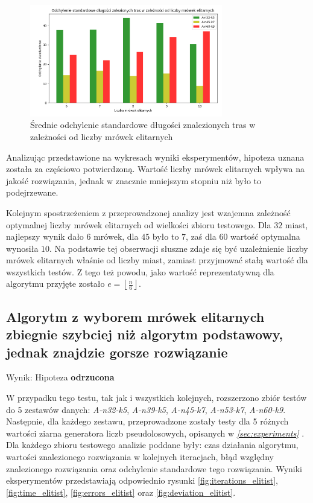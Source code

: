 \documentclass[10pt]{article}
\begin{document}
\begin{figure}[H]
    \centering
    \includegraphics[width=0.75\textwidth]{deviation_e.png}
    \caption{Średnie odchylenie standardowe długości znalezionych tras w zależności od liczby mrówek elitarnych}
    \label{fig:deviation_e}
\end{figure}

Analizując przedstawione na wykresach wyniki eksperymentów, hipoteza uznana została za częściowo potwierdzoną. Wartość liczby mrówek elitarnych wpływa na jakość rozwiązania, jednak w znacznie mniejszym stopniu niż było to podejrzewane.

Kolejnym spostrzeżeniem z przeprowadzonej analizy jest wzajemna zależność optymalnej liczby mrówek elitarnych od wielkości zbioru testowego. Dla $32$ miast, najlepszy wynik dało $6$ mrówek, dla $45$ było to $7$, zaś dla $60$ wartość optymalna wynosiła $10$. Na podstawie tej obserwacji słuszne zdaje się być uzależnienie liczby mrówek elitarnych właśnie od liczby miast, zamiast przyjmować stałą wartość dla wszystkich testów. Z tego też powodu, jako wartość reprezentatywną dla algorytmu przyjęte zostało $e = \left\lfloor\frac{n}{6}\right\rfloor$.

\subsection{Algorytm z wyborem mrówek elitarnych zbiegnie szybciej niż algorytm podstawowy, jednak znajdzie gorsze rozwiązanie}
Wynik: Hipoteza \textbf{odrzucona}

W przypadku tego testu, tak jak i wszystkich kolejnych, rozszerzono zbiór testów do 5 zestawów danych: \mbox{\textit{A-n32-k5}}, \textit{A-n39-k5}, \textit{A-n45-k7}, \textit{A-n53-k7}, \textit{A-n60-k9}. Następnie, dla każdego zestawu, przeprowadzone zostały testy dla 5 różnych wartości ziarna generatora liczb pseudolosowych, opisanych w \textit{\ref{sec:experiments} }.
Dla każdego zbioru testowego analizie poddane były: czas działania algorytmu, wartości znalezionego rozwiązania w kolejnych iteracjach, błąd względny znalezionego rozwiązania oraz odchylenie standardowe tego rozwiązania. Wyniki eksperymentów przedstawiają odpowiednio rysunki \ref{fig:iterations_elitist}, \ref{fig:time_elitist}, \ref{fig:errors_elitist} oraz \ref{fig:deviation_elitist}.
\end{document}
